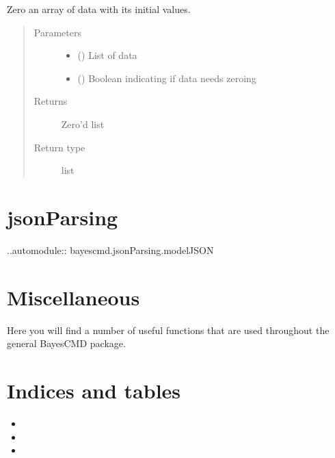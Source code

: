 \documentclass[letterpaper,10pt,english]{sphinxmanual}
\begin{document}
\begin{fulllineitems}
\label{\detokenize{abc:bayescmd.abc.distances.zero_array}}
Zero an array of data with its initial values.
\begin{quote}\begin{description}
\item[{Parameters}] \leavevmode\begin{itemize}
\item {} 
 () \textendash{} List of data

\item {} 
 () \textendash{} Boolean indicating if data needs zeroing

\end{itemize}

\item[{Returns}] \leavevmode
{} \textendash{} Zero’d list

\item[{Return type}] \leavevmode
list

\end{description}\end{quote}

\end{fulllineitems}



\chapter{jsonParsing}
\label{\detokenize{jsonParsing::doc}}\label{\detokenize{jsonParsing:jsonparsing}}
..automodule:: bayescmd.jsonParsing.modelJSON


\chapter{Miscellaneous}
\label{\detokenize{misc::doc}}\label{\detokenize{misc:miscellaneous}}
Here you will find a number of useful functions that are used throughout
the general BayesCMD package.


\chapter{Indices and tables}
\label{\detokenize{index:indices-and-tables}}\begin{itemize}
\item {} 

\item {} 

\item {} 

\end{itemize}
\end{document}
